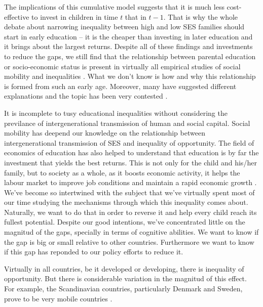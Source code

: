 \documentclass[11pt, a4paper]{article}\usepackage[]{graphicx}\usepackage[]{color}
\begin{document}
The implications of this cumulative model suggests that it is much less cost-effective to invest in children in time \(t\) that in \(t-1\). That is why the whole debate about narrowing inequality between high and low SES families should start in early education -- it is the cheaper than investing in later education and it brings about the largest returns. Despite all of these findings and investments to reduce the gaps, we still find that the relationship between parental education or socio-economic status is present in virtually all empirical studies of social mobility and inequalities \citep{breen1997, breen2007, waldfogel2006, bradbury2015, chetty2016}. What we don't know is how and why this relationship is formed from such an early age. Moreover, many have suggested different explanations and the topic has been very contested \citep{brooks1997}.

It is incomplete to tusy educational inequalities without considering the previlance of intergenerational transmission of human and social capital. Social mobility has deepend our knowledge on the relationship between intergenerational transmission of SES and inequality of opportunity. The field of economics of education has also helped to understand that education is by far the investment that yields the best returns. This is not only for the child and his/her family, but to society as a whole, as it boosts economic activity, it helps the labour market to improve job conditions and maintain a rapid economic growth \citep{hanushek2007}. We've become so intertwined with the subject that we've virtually spent most of our time studying the mechanisms through which this inequality comes about. Naturally, we want to do that in order to reverse it and help every child reach its fullest potential. Despite our good intentions, we've concentrated little on the magnitud of the gaps, specially in terms of cognitive abilities. We want to know if the gap is big or small relative to other countries. Furthermore we want to know if this gap has reponded to our policy efforts to reduce it.

Virtually in all countries, be it developed or developing, there is inequality of opportunity. But there is considerable variation in the magnitud of this effect. For example, the Scandinavian countries, particularly Denmark and Sweden, prove to be very mobile countries \citep{esping2012, breen2007, shavit1993}.
\end{document}
